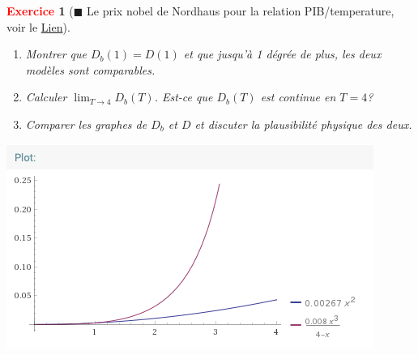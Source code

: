 \documentclass[11pt]{article}
\theoremstyle{mythmstyle}
\newtheorem{exo}{\textcolor{red}{\textbf{Exercice}}}
\begin{document}
\begin{exo}[$\blacksquare$ Le prix nobel de Nordhaus pour la relation PIB/temperature, voir le \href{https://www.youtube.com/watch?v=vwwvZ8g5eHE}{Lien}]
\begin{enumerate}
\begin{enumerate}
    \item Montrer que $D_b(1)=D(1)$ et que jusqu'à 1 dégrée de plus, les deux modèles sont comparables.
    \item Calculer $\lim_{T\to 4} D_b(T)$. Est-ce que $D_b(T)$ est continue en $T=4$?
    \item Comparer les graphes de $D_b$ et $D$ et discuter la  plausibilité physique des deux.
\end{enumerate}

\begin{solution}

    \begin{center}
        \includegraphics[scale=0.8]{nordhausfunctioncorrected.png}
    \end{center}
\end{solution}


\end{enumerate}





\end{exo}
\end{document}

